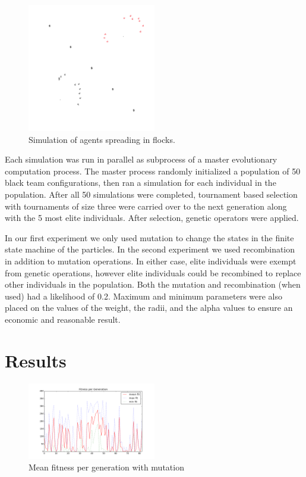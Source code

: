 \documentclass[12pt,journal,compsoc]{IEEEtran}
\begin{document}
\begin{figure}[h!]
    \centering
        \includegraphics[width=0.5\textwidth]{figures/simulation}
    \caption{Simulation of agents spreading in flocks.}
\end{figure}

Each simulation was run in parallel as subprocess of a master evolutionary computation process. The master process randomly initialized a population of 50 black team configurations, then ran a simulation for each individual in the population. After all 50 simulations were completed, tournament based selection with tournaments of size three were carried over to the next generation along with the 5 most elite individuals. After selection, genetic operators were applied.

In our first experiment we only used mutation to change the states in the finite state machine of the particles. In the second experiment we used recombination in addition to mutation operations. In either case, elite individuals were exempt from genetic operations, however elite individuals could be recombined to replace other individuals in the population. Both the mutation and recombination (when used) had a likelihood of 0.2. Maximum and minimum parameters were also placed on the values of the weight, the radii, and the alpha values to ensure an economic and reasonable result.

\section{Results}

\begin{figure}[h!]
    \centering
        \includegraphics[width=0.5\textwidth]{figures/meanfit_experiment1}
    \caption{Mean fitness per generation with mutation}
\end{figure}
\end{document}
